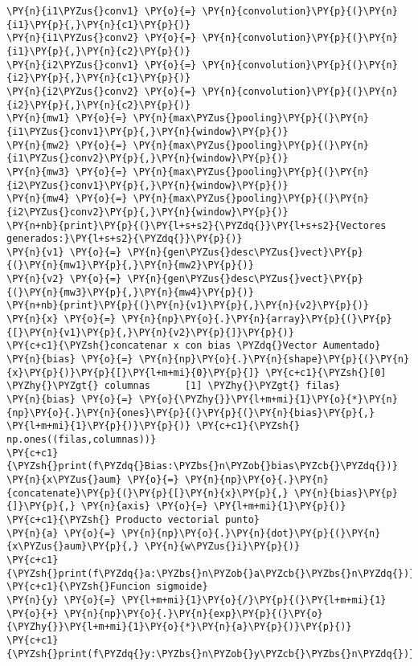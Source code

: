 \begin{tcolorbox}[breakable, size=fbox, boxrule=1pt, pad at break*=1mm,colback=cellbackground, colframe=cellborder]
\begin{Verbatim}[commandchars=\\\{\}]
\PY{n}{i1\PYZus{}conv1} \PY{o}{=} \PY{n}{convolution}\PY{p}{(}\PY{n}{i1}\PY{p}{,}\PY{n}{c1}\PY{p}{)}
\PY{n}{i1\PYZus{}conv2} \PY{o}{=} \PY{n}{convolution}\PY{p}{(}\PY{n}{i1}\PY{p}{,}\PY{n}{c2}\PY{p}{)}
\PY{n}{i2\PYZus{}conv1} \PY{o}{=} \PY{n}{convolution}\PY{p}{(}\PY{n}{i2}\PY{p}{,}\PY{n}{c1}\PY{p}{)}
\PY{n}{i2\PYZus{}conv2} \PY{o}{=} \PY{n}{convolution}\PY{p}{(}\PY{n}{i2}\PY{p}{,}\PY{n}{c2}\PY{p}{)}
\PY{n}{mw1} \PY{o}{=} \PY{n}{max\PYZus{}pooling}\PY{p}{(}\PY{n}{i1\PYZus{}conv1}\PY{p}{,}\PY{n}{window}\PY{p}{)}
\PY{n}{mw2} \PY{o}{=} \PY{n}{max\PYZus{}pooling}\PY{p}{(}\PY{n}{i1\PYZus{}conv2}\PY{p}{,}\PY{n}{window}\PY{p}{)}
\PY{n}{mw3} \PY{o}{=} \PY{n}{max\PYZus{}pooling}\PY{p}{(}\PY{n}{i2\PYZus{}conv1}\PY{p}{,}\PY{n}{window}\PY{p}{)}
\PY{n}{mw4} \PY{o}{=} \PY{n}{max\PYZus{}pooling}\PY{p}{(}\PY{n}{i2\PYZus{}conv2}\PY{p}{,}\PY{n}{window}\PY{p}{)}
\PY{n+nb}{print}\PY{p}{(}\PY{l+s+s2}{\PYZdq{}}\PY{l+s+s2}{Vectores generados:}\PY{l+s+s2}{\PYZdq{}}\PY{p}{)}
\PY{n}{v1} \PY{o}{=} \PY{n}{gen\PYZus{}desc\PYZus{}vect}\PY{p}{(}\PY{n}{mw1}\PY{p}{,}\PY{n}{mw2}\PY{p}{)}
\PY{n}{v2} \PY{o}{=} \PY{n}{gen\PYZus{}desc\PYZus{}vect}\PY{p}{(}\PY{n}{mw3}\PY{p}{,}\PY{n}{mw4}\PY{p}{)}
\PY{n+nb}{print}\PY{p}{(}\PY{n}{v1}\PY{p}{,}\PY{n}{v2}\PY{p}{)}
\PY{n}{x} \PY{o}{=} \PY{n}{np}\PY{o}{.}\PY{n}{array}\PY{p}{(}\PY{p}{[}\PY{n}{v1}\PY{p}{,}\PY{n}{v2}\PY{p}{]}\PY{p}{)}
\PY{c+c1}{\PYZsh{}concatenar x con bias \PYZdq{}Vector Aumentado}
\PY{n}{bias} \PY{o}{=} \PY{n}{np}\PY{o}{.}\PY{n}{shape}\PY{p}{(}\PY{n}{x}\PY{p}{)}\PY{p}{[}\PY{l+m+mi}{0}\PY{p}{]} \PY{c+c1}{\PYZsh{}[0] \PYZhy{}\PYZgt{} columnas      [1] \PYZhy{}\PYZgt{} filas}
\PY{n}{bias} \PY{o}{=} \PY{o}{\PYZhy{}}\PY{l+m+mi}{1}\PY{o}{*}\PY{n}{np}\PY{o}{.}\PY{n}{ones}\PY{p}{(}\PY{p}{(}\PY{n}{bias}\PY{p}{,} \PY{l+m+mi}{1}\PY{p}{)}\PY{p}{)} \PY{c+c1}{\PYZsh{} np.ones((filas,columnas))}
\PY{c+c1}{\PYZsh{}print(f\PYZdq{}Bias:\PYZbs{}n\PYZob{}bias\PYZcb{}\PYZdq{})}
\PY{n}{x\PYZus{}aum} \PY{o}{=} \PY{n}{np}\PY{o}{.}\PY{n}{concatenate}\PY{p}{(}\PY{p}{[}\PY{n}{x}\PY{p}{,} \PY{n}{bias}\PY{p}{]}\PY{p}{,} \PY{n}{axis} \PY{o}{=} \PY{l+m+mi}{1}\PY{p}{)}
\PY{c+c1}{\PYZsh{} Producto vectorial punto}
\PY{n}{a} \PY{o}{=} \PY{n}{np}\PY{o}{.}\PY{n}{dot}\PY{p}{(}\PY{n}{x\PYZus{}aum}\PY{p}{,} \PY{n}{w\PYZus{}i}\PY{p}{)}
\PY{c+c1}{\PYZsh{}print(f\PYZdq{}a:\PYZbs{}n\PYZob{}a\PYZcb{}\PYZbs{}n\PYZdq{})}
\PY{c+c1}{\PYZsh{}Funcion sigmoide}
\PY{n}{y} \PY{o}{=} \PY{l+m+mi}{1}\PY{o}{/}\PY{p}{(}\PY{l+m+mi}{1} \PY{o}{+} \PY{n}{np}\PY{o}{.}\PY{n}{exp}\PY{p}{(}\PY{o}{\PYZhy{}}\PY{l+m+mi}{1}\PY{o}{*}\PY{n}{a}\PY{p}{)}\PY{p}{)}
\PY{c+c1}{\PYZsh{}print(f\PYZdq{}y:\PYZbs{}n\PYZob{}y\PYZcb{}\PYZbs{}n\PYZdq{})}

\end{Verbatim}
\end{tcolorbox}
